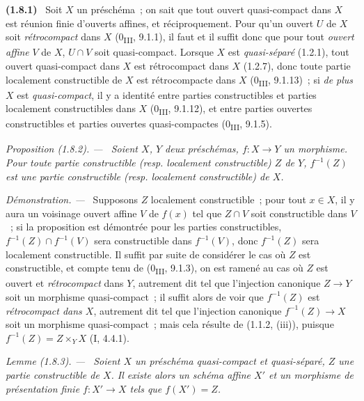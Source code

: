 \documentclass[10pt,oneside]{book}
\makeatletter
\newcommand{\setmanualcurrentlabel}[1]{\def\@currentlabel{#1}}
\newcommand{\oldpage}[2][]{%
  \setcounter{footnote}{0}%
  \marginpar{\scriptsize\textbf{#1}~|~#2}\ignorespaces}
\newenvironment{env}[1][]{\setmanualcurrentlabel{#1}\par\medskip\noindent\textbf{(#1)}\ }{\par}
\newenvironment{proposition}[1][]{%
  \setmanualcurrentlabel{#1}\par\medskip\noindent\itshape Proposition (#1). ---\ }{\par}
\newenvironment{lemma}[1][]{%
  \setmanualcurrentlabel{#1}\par\medskip\noindent\itshape Lemme (#1). ---\ }{\par}
\newenvironment{proof}{%
  \par\medskip\noindent\textit{Démonstration. ---\ }}{\par}
\makeatother
\begin{document}
\oldpage[IV-1]{238}

\begin{env}[1.8.1]
\label{IV.1.8.1-fr}
Soit $X$ un préschéma~; on sait que tout ouvert quasi-compact dans $X$ est
réunion finie d'ouverts affines, et réciproquement. Pour qu'un ouvert $U$ de
$X$ soit \emph{rétrocompact} dans $X$ (0\textsubscript{III}, 9.1.1), il faut
et il suffit donc que pour tout \emph{ouvert affine} $V$ de $X$, $U\cap V$
soit quasi-compact. Lorsque $X$ est \emph{quasi-séparé} (1.2.1), tout ouvert
quasi-compact dans $X$ est rétrocompact dans $X$ (1.2.7), donc toute partie
localement constructible de $X$ est rétrocompacte dans $X$
(0\textsubscript{III}, 9.1.13)~; si \emph{de plus} $X$ est
\emph{quasi-compact}, il y a identité entre parties constructibles et parties
localement constructibles dans $X$ (0\textsubscript{III}, 9.1.12), et entre
parties ouvertes constructibles et parties ouvertes quasi-compactes
(0\textsubscript{III}, 9.1.5).
\end{env}

\begin{proposition}[1.8.2]
\label{IV.1.8.2-fr}
Soient $X$, $Y$ deux préschémas, $f:X\to Y$ un morphisme. Pour toute partie
constructible (resp. localement constructible) $Z$ de $Y$, $f^{-1}(Z)$ est
une partie constructible (resp. localement constructible) de $X$.
\end{proposition}

\begin{proof}
Supposons $Z$ localement constructible~; pour tout $x\in X$, il y aura un
voisinage ouvert affine $V$ de $f(x)$ tel que $Z\cap V$ soit constructible
dans $V$~; si la proposition est démontrée pour les parties constructibles,
$f^{-1}(Z)\cap f^{-1}(V)$ sera constructible dans $f^{-1}(V)$, donc
$f^{-1}(Z)$ sera localement constructible. Il suffit par suite de considérer
le cas où $Z$ est constructible, et compte tenu de (0\textsubscript{III},
9.1.3), on est ramené au cas où $Z$ est ouvert et \emph{rétrocompact} dans
$Y$, autrement dit tel que l'injection canonique $Z\to Y$ soit un morphisme
quasi-compact~; il suffit alors de voir que $f^{-1}(Z)$ est
\emph{rétrocompact dans $X$}, autrement dit tel que l'injection canonique
$f^{-1}(Z)\to X$ soit un morphisme quasi-compact~; mais cela résulte de
(1.1.2, (iii)), puisque $f^{-1}(Z)=Z\times_YX$ (I, 4.4.1).
\end{proof}

\begin{lemma}[1.8.3]
\label{IV.1.8.3-fr}
Soient $X$ un préschéma quasi-compact et quasi-séparé, $Z$ une partie
constructible de $X$. Il existe alors un schéma affine $X'$ et un morphisme
de présentation finie $f:X'\to X$ tels que $f(X')=Z$.
\end{lemma}
\end{document}
